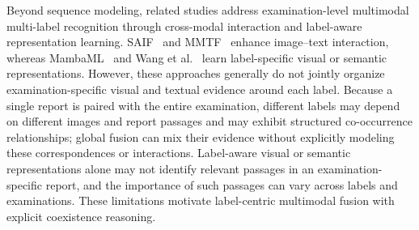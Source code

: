 
Beyond sequence modeling, related studies address examination-level multimodal multi-label recognition through cross-modal interaction and label-aware representation learning. SAIF~\cite{zhang2025saif} and MMTF~\cite{zhong2026mmtf} enhance image--text interaction, whereas MambaML~\cite{zhu2025mambaml} and Wang et al.~\cite{wang2025granularity} learn label-specific visual or semantic representations. However, these approaches generally do not jointly organize examination-specific visual and textual evidence around each label. Because a single report is paired with the entire examination, different labels may depend on different images and report passages and may exhibit structured co-occurrence relationships; global fusion can mix their evidence without explicitly modeling these correspondences or interactions. Label-aware visual or semantic representations alone may not identify relevant passages in an examination-specific report, and the importance of such passages can vary across labels and examinations. These limitations motivate label-centric multimodal fusion with explicit coexistence reasoning.


